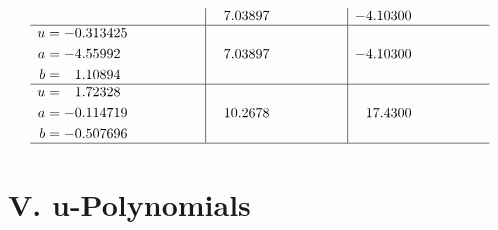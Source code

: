 \documentclass[1p]{elsarticle_modified}
\theoremstyle{definition}
\begin{document}
$$\begin{array}{c|c|c}
 & \phantom{-}7.03897\phantom{ +0.000000I} & -4.10300\phantom{ +0.000000I} \\ \hline\begin{aligned}
u &= -0.313425\phantom{ +0.000000I} \\
a &= -4.55992\phantom{ +0.000000I} \\
b &= \phantom{-}1.10894\phantom{ +0.000000I}\end{aligned}
 & \phantom{-}7.03897\phantom{ +0.000000I} & -4.10300\phantom{ +0.000000I} \\ \hline\begin{aligned}
u &= \phantom{-}1.72328\phantom{ +0.000000I} \\
a &= -0.114719\phantom{ +0.000000I} \\
b &= -0.507696\phantom{ +0.000000I}\end{aligned}
 & \phantom{-}10.2678\phantom{ +0.000000I} & \phantom{-}17.4300\phantom{ +0.000000I}\\
 \hline 
 \end{array}$$\newpage
\newpage\renewcommand{\arraystretch}{1}
\centering \section*{ V. u-Polynomials}
\end{document}
